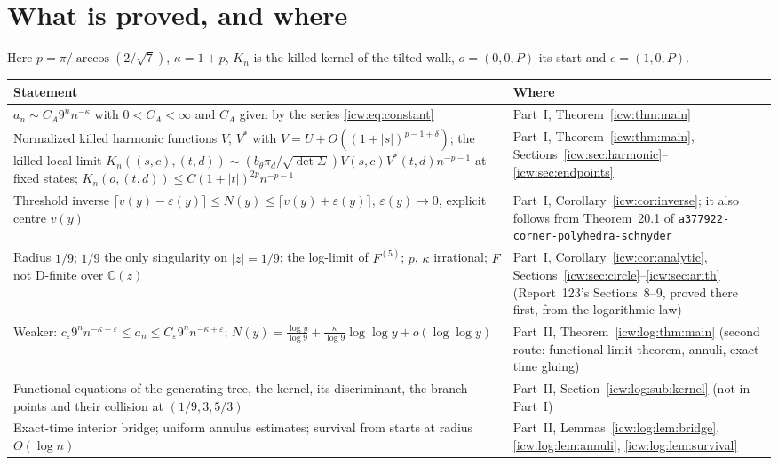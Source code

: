 \documentclass[11pt,letterpaper]{article}
\theoremstyle{remark}\newtheorem{remark}[theorem]{Remark}
\newcommand{\CC}{\mathbb C}
\newcommand{\eps}{\varepsilon}
\newcommand{\1}{\mathbf1}
\newcommand{\file}[1]{\textup{\nolinkurl{#1}}}
\begin{document}
\section*{What is proved, and where}\label{icw:sec:status}
Here $p=\pi/\arccos(2/\sqrt7)$, $\kappa=1+p$, $K_n$ is the killed kernel of the tilted walk, $o=(0,0,P)$ its start and $e=(1,0,P)$.
\begin{center}
\small\renewcommand{\arraystretch}{1.25}
\begin{longtable}{@{}>{\raggedright\arraybackslash}p{} >{\raggedright\arraybackslash}p{}@{}}
\toprule
Statement & Where\\
\midrule
\endhead
$a_n\sim C_A9^nn^{-\kappa}$ with $0<C_A<\infty$ and $C_A$ given by the series \eqref{icw:eq:constant} & Part~I, Theorem~\ref{icw:thm:main}\\
Normalized killed harmonic functions $V$, $V^*$ with $V=U+O((1+|s|)^{p-1+\delta})$; the killed local limit $K_n((s,c),(t,d))\sim(b_\theta\pi_d/\sqrt{\det\Sigma})V(s,c)V^*(t,d)n^{-p-1}$ at fixed states; $K_n(o,(t,d))\le C(1+|t|)^{2p}n^{-p-1}$ & Part~I, Theorem~\ref{icw:thm:main}, Sections~\ref{icw:sec:harmonic}--\ref{icw:sec:endpoints}\\
Threshold inverse $\lceil v(y)-\eps(y)\rceil\le N(y)\le\lceil v(y)+\eps(y)\rceil$, $\eps(y)\to0$, explicit centre $v(y)$ & Part~I, Corollary~\ref{icw:cor:inverse}; it also follows from Theorem~20.1 of \file{a377922-corner-polyhedra-schnyder}\\
Radius $1/9$; $1/9$ the only singularity on $|z|=1/9$; the log-limit of $F^{(5)}$; $p$, $\kappa$ irrational; $F$ not D-finite over $\CC(z)$ & Part~I, Corollary~\ref{icw:cor:analytic}, Sections~\ref{icw:sec:circle}--\ref{icw:sec:arith} (Report~123's Sections~8--9, proved there first, from the logarithmic law)\\
Weaker: $c_\eps9^nn^{-\kappa-\eps}\le a_n\le C_\eps9^nn^{-\kappa+\eps}$; $N(y)=\frac{\log y}{\log9}+\frac{\kappa}{\log9}\log\log y+o(\log\log y)$ & Part~II, Theorem~\ref{icw:log:thm:main} (second route: functional limit theorem, annuli, exact-time gluing)\\
Functional equations of the generating tree, the kernel, its discriminant, the branch points and their collision at $(1/9,3,5/3)$ & Part~II, Section~\ref{icw:log:sub:kernel} (not in Part~I)\\
Exact-time interior bridge; uniform annulus estimates; survival from starts at radius $O(\log n)$ & Part~II, Lemmas~\ref{icw:log:lem:bridge}, \ref{icw:log:lem:annuli}, \ref{icw:log:lem:survival}\\

\end{longtable}
\end{center}
\end{document}
